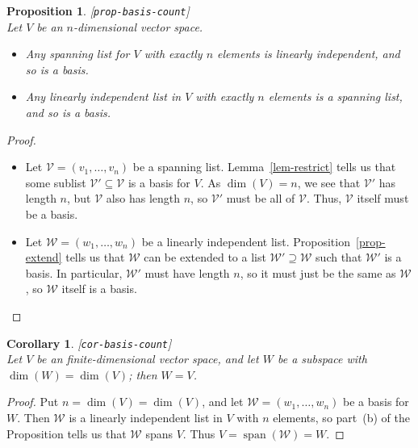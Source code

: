 \documentclass{amsart}
\newcommand{\lbl}[1]{\label{#1}\textup{[\texttt{#1}]}\ \\}
\newcommand{\lbl}{\label}
\newcommand{\spn}       {\operatorname{span}}
\newcommand{\sse}       {\subseteq}
\newcommand{\CV}        {{\mathcal{V}}}
\newcommand{\CW}        {{\mathcal{W}}}
\renewcommand{\:}       {\colon}
\newtheorem{proposition}[theorem]{Proposition}
\newtheorem{corollary}[theorem]{Corollary}
\theoremstyle{definition}
\begin{document}
\begin{proposition}\lbl{prop-basis-count}
 Let $V$ be an $n$-dimensional vector space.
 \begin{itemize}
  \item[(a)] Any spanning list for $V$ with exactly $n$
   elements is linearly independent, and so is a basis.
  \item[(b)] Any linearly independent list in $V$ with
   exactly $n$ elements is a spanning list, and so is a
   basis. 
 \end{itemize}
\end{proposition}
\begin{proof}
 \begin{itemize}
  \item[(a)] Let $\CV=(v_1,\dotsc,v_n)$ be a spanning list.
   Lemma~\ref{lem-restrict} tells us that some sublist
   $\CV'\sse\CV$ is a basis for $V$.  As $\dim(V)=n$, we see
   that $\CV'$ has length $n$, but $\CV$ also has length
   $n$, so $\CV'$ must be all of $\CV$.  Thus, $\CV$ itself
   must be a basis.
  \item[(b)] Let $\CW=(w_1,\dotsc,w_n)$ be a linearly
   independent list.  Proposition~\ref{prop-extend} tells us
   that $\CW$ can be extended to a list $\CW'\supseteq\CW$
   such that $\CW'$ is a basis.  In particular, $\CW'$ must
   have length $n$, so it must just be the same as $\CW$, so
   $\CW$ itself is a basis.
 \end{itemize}
\end{proof}
\begin{corollary}\lbl{cor-basis-count}
 Let $V$ be an finite-dimensional vector space, and let $W$ be
 a subspace with $\dim(W)=\dim(V)$; then $W=V$.
\end{corollary}
\begin{proof}
 Put $n=\dim(V)=\dim(V)$, and let $\CW=(w_1,\dotsc,w_n)$ be
 a basis for $W$.  Then $\CW$ is a linearly independent list
 in $V$ with $n$ elements, so part~(b) of the Proposition
 tells us that $\CW$ spans $V$.  Thus $V=\spn(\CW)=W$.
\end{proof}
\end{document}
